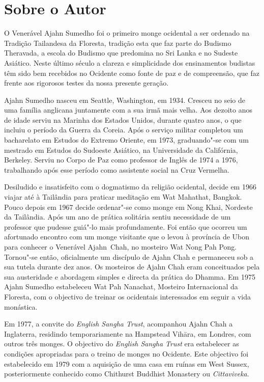 \chapter{Sobre o Autor}

\thispagestyle{bottomcenter}
\enlargethispage{\baselineskip}

O Venerável Ajahn Sumedho foi o primeiro monge ocidental a ser ordenado na 
Tradição Tailandesa da Floresta, tradição esta que faz parte do Budismo Theravada, 
a escola do Budismo que predomina no Sri Lanka e no Sudeste Asiático.
Neste último século a clareza e simplicidade dos ensinamentos budistas têm sido
bem recebidos no Ocidente como fonte de paz e de compreensão, que faz frente
aos rigorosos testes da nossa presente geração.

Ajahn Sumedho nasceu em Seattle, Washington, em 1934. Cresceu no seio de uma
família anglicana juntamente com a sua irmã mais velha. Aos dezoito anos de idade
serviu na Marinha dos Estados Unidos, durante quatro anos, o que incluiu o
período da Guerra da Coreia. Após o serviço militar completou um bacharelato em
Estudos do Extremo Oriente, em 1973, graduando"-se com um mestrado em Estudos do
Sudoeste Asiático, na Universidade da Califórnia, Berkeley. Serviu no Corpo de
Paz como professor de Inglês de 1974 a 1976, trabalhando após esse período como
assistente social na Cruz Vermelha.

Desiludido e insatisfeito com o dogmatismo da religião ocidental, decide em 1966
viajar até à Tailândia para praticar meditação em Wat Mahathat, Bangkok. Pouco
depois em 1967 decide ordenar"-se como monge em Nong Khai, Nordeste da Tailândia.
Após um ano de prática solitária sentiu necessidade de um professor que pudesse
guiá"-lo mais profundamente. Foi então que ocorreu um afortunado encontro com um
monge visitante que o levou à província de Ubon para conhecer o Venerável
Ajahn~Chah,
no mosteiro Wat Nong Pah Pong. Tornou"-se então, oficialmente um discípulo
de Ajahn Chah e permaneceu sob a sua tutela durante dez anos. Os mosteiros de
Ajahn Chah eram conceituados pela sua austeridade e abordagem simples e directa
da prática do Dhamma. Em 1975 Ajahn Sumedho estabeleceu Wat Pah Nanachat,
Mosteiro Internacional da Floresta, com o objectivo de treinar os ocidentais
interessados em seguir a vida monástica.

Em 1977, a convite do \emph{English Sangha Trust}, acompanhou Ajahn Chah a
Inglaterra, residindo temporariamente na Hampstead Vihāra, em Londres, com
outros três monges. O objectivo do \emph{English Sangha Trust} era estabelecer
as condições apropriadas para o treino de monges no Ocidente. Este objectivo foi
estabelecido em 1979 com a aquisição de uma casa em ruínas em West Sussex,
posteriormente conhecido como Chithurst Buddhist Monastery ou
\emph{Cittaviveka}.

